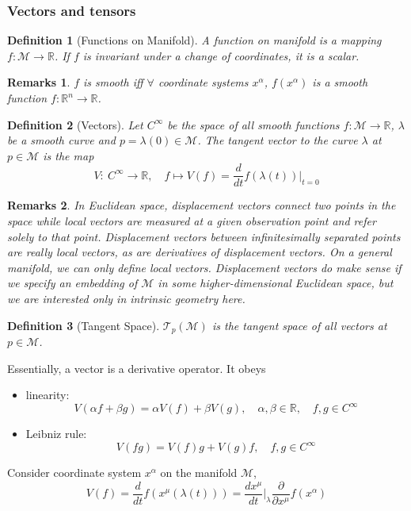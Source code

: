 \documentclass[a4paper]{article}
\newtheorem{remarks}{Remarks}[section]
\theoremstyle{new}
\newtheorem{defi}{Definition}[section]
\begin{document}
\subsubsection{Vectors and tensors}
\begin{defi}[Functions on Manifold]
A function on manifold is a mapping $f:\mathcal{M}\rightarrow\mathbb{R}$. If $f$ is invariant under a change of coordinates, it is a scalar.
\end{defi}
\begin{remarks}
$f$ is smooth iff $\forall $ coordinate systems $x^\alpha$, $f(x^\alpha)$ is a smooth function $f:\mathbb{R}^n\rightarrow\mathbb{R}$. 
\end{remarks}
\begin{defi}[Vectors]
Let $C^\infty$ be the space of all smooth functions $f:\mathcal{M}\rightarrow\mathbb{R}$, $\lambda$ be a smooth curve and $p=\lambda(0)\in\mathcal{M}$. The tangent vector to the curve $\lambda$ at $p\in\mathcal{M}$ is the map
$$V:~C^\infty\rightarrow\mathbb{R},\quad f\mapsto V(f)=\frac{d}{dt}f(\lambda(t))\bigg|_{t=0}$$
\end{defi}
\begin{remarks}
In Euclidean space, displacement vectors connect two points in the space while local vectors are measured at a given observation point and refer solely to that point. Displacement vectors between infinitesimally separated points are really local vectors, as are derivatives of displacement vectors. On a general manifold, we can only define local vectors. Displacement vectors do make sense if we specify an embedding of $\mathcal{M}$ in some higher-dimensional Euclidean space, but we are interested only in intrinsic geometry here.
\end{remarks}
\begin{defi}[Tangent Space]
$\mathcal{T}_p(\mathcal{M})$ is the tangent space of all vectors at $p\in\mathcal{M}$.
\end{defi}
Essentially, a vector is a derivative operator. It obeys
\begin{itemize}
    \item linearity: 
    $$V(\alpha f+\beta g)=\alpha V(f)+\beta V(g),\quad\alpha,\beta\in\mathbb{R},\quad f,g\in C^\infty$$
    \item Leibniz rule:
    $$V(fg)=V(f)g+V(g)f,\quad f,g\in C^\infty$$
\end{itemize}
Consider coordinate system $x^\alpha$ on the manifold $\mathcal{M}$, 
$$V(f)=\frac{d}{dt}f(x^\mu(\lambda(t)))=\frac{dx^\mu}{dt}\bigg|_\lambda\frac{\partial}{\partial x^\mu}f(x^\alpha)$$
\end{document}
